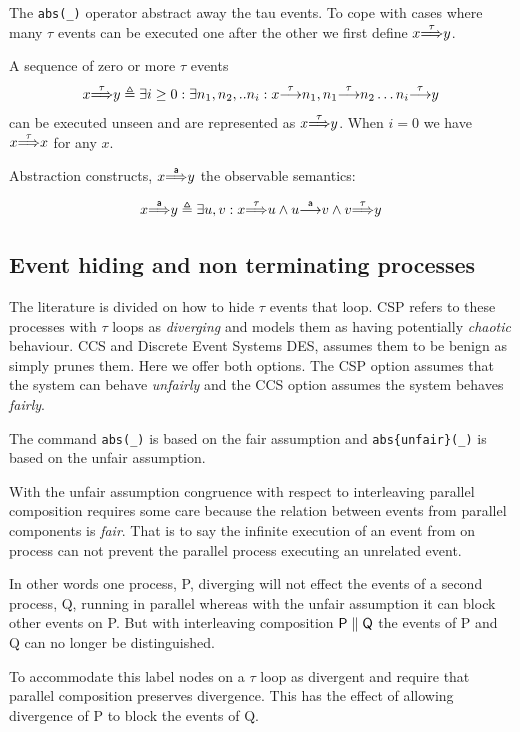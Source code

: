 \documentclass[]{article}
\begin{document}
 The \verb|abs(_)|  operator abstract away the {\sf tau} events. To cope with cases where many $\tau$ events can be executed one after the other we first define  ${x}{\stackrel{\tau}{\Longrightarrow}}{y} $.

  A sequence of zero or more $\tau$ events
  \[{x}{\stackrel{\tau}{\Longrightarrow}}{y}  \triangleq \exists i\geq 0 : \exists n_1,n_2,..n_i :{x}{\stackrel{\tau}{\longrightarrow}}{n_1} , {n_1}{\stackrel{\tau}{\longrightarrow}}{n_2} \ldots {n_i}{\stackrel{\tau}{\longrightarrow}}{y} \]
   can be  executed unseen and are represented as ${x}{\stackrel{\tau}{\Longrightarrow}}{y} $. When $i=0$ we have ${x}{\stackrel{\tau}{\Longrightarrow}}{x} $ for any $x$.


 Abstraction constructs, ${x}{\stackrel{\sf a}{\Longrightarrow}}{y} $ the observable semantics:


   \[{x}{\stackrel{\sf a}{\Longrightarrow}}{y}   \triangleq \exists u,v :   {x}{\stackrel{\sf \tau}{\Longrightarrow}}{u}  \land  {u}{\stackrel{\sf a}{\longrightarrow}}{v}   \land {v}{\stackrel{\sf \tau}{\Longrightarrow}}{y} 
 \]


 \subsection{Event hiding and non terminating processes }

 The literature is divided on how to hide $\tau$ events that loop.  CSP  refers to these processes with $\tau$ loops  as \emph{diverging} and models them as having potentially \emph{chaotic} behaviour. CCS   and Discrete Event Systems DES, assumes them to be benign as simply prunes them. Here we offer both options. The CSP option assumes that the system can behave \emph{unfairly} and the CCS option assumes the system behaves \emph{fairly}.



 The command \verb|abs(_)| is based on the fair assumption and \verb|abs{unfair}(_)| is based on the unfair assumption.



With the unfair assumption congruence with respect to interleaving parallel composition requires some care because the relation  between events from parallel components is \emph{fair}. That is to say the infinite execution of an event from on process can not prevent the parallel process executing an unrelated event.

In other words one process, {\sf P},  diverging will not effect the events of a second process, {\sf Q},  running in parallel whereas with the unfair assumption it can block other events on {\sf P}. But with interleaving composition ${\sf P\parallel Q}$ the events of {\sf P} and {\sf Q} can no longer be distinguished.

To accommodate this label nodes on a $\tau$ loop as divergent and require that parallel composition preserves divergence. This has the effect of allowing divergence of {\sf P} to block the events of {\sf Q}.
\end{document}
